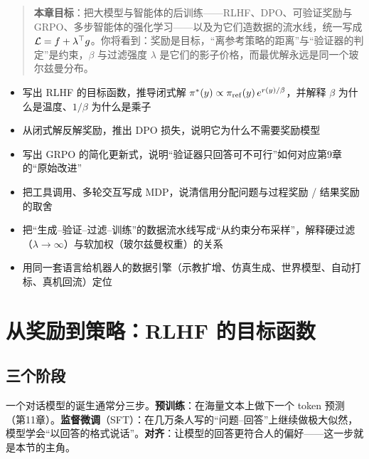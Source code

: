 \begin{quote}
\textbf{本章目标}：把大模型与智能体的后训练——RLHF、DPO、可验证奖励与 GRPO、多步智能体的强化学习——以及为它们造数据的流水线，统一写成 $\mathcal{L} = f + \lambda^\top g$。你将看到：奖励是目标，“离参考策略的距离”与“验证器的判定”是约束，$\beta$ 与过滤强度 $\lambda$ 是它们的影子价格，而最优解永远是同一个玻尔兹曼分布。
\end{quote}

\begin{tcolorbox}[colback=green!5, colframe=green!60!black, title=学完这章，你将能够...]
\begin{itemize}
    \item 写出 RLHF 的目标函数，推导闭式解 $\pi^*(y) \propto \pi_{\rm ref}(y)\,e^{r(y)/\beta}$，并解释 $\beta$ 为什么是温度、$1/\beta$ 为什么是乘子
    \item 从闭式解反解奖励，推出 DPO 损失，说明它为什么不需要奖励模型
    \item 写出 GRPO 的简化更新式，说明“验证器只回答可不可行”如何对应第9章的“原始改进”
    \item 把工具调用、多轮交互写成 MDP，说清信用分配问题与过程奖励 / 结果奖励的取舍
    \item 把“生成--验证--过滤--训练”的数据流水线写成“从约束分布采样”，解释硬过滤（$\lambda\to\infty$）与软加权（玻尔兹曼权重）的关系
    \item 用同一套语言给机器人的数据引擎（示教扩增、仿真生成、世界模型、自动打标、真机回流）定位
\end{itemize}
\end{tcolorbox}

\section{从奖励到策略：RLHF 的目标函数}

\subsection{三个阶段}

一个对话模型的诞生通常分三步。\textbf{预训练}：在海量文本上做下一个 token 预测（第11章）。\textbf{监督微调}（SFT）：在几万条人写的“问题--回答”上继续做极大似然，模型学会“以回答的格式说话”。\textbf{对齐}：让模型的回答更符合人的偏好——这一步就是本节的主角。

